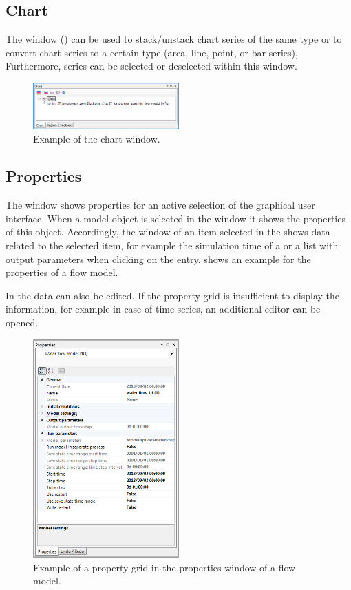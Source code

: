 \subsection{Chart}
\label{subsec:chart}
The  window () can be used to stack/unstack chart series of the same type or to convert chart series to a certain type (area, line, point, or bar series), Furthermore, series can be selected or deselected within this window.
 
\begin{figure} [H]
	\centering
		\includegraphics[width=0.5\textwidth]{Figures/Chapter_overview/view_chart_window.png}
	\caption{Example of the chart window.}
	\label{fig:chartwindow}
\end{figure}
%
\subsection{Properties}
\label{subsec:properties}
%
The  window shows properties for an active selection of the graphical user interface. When a model object is selected in the  window it shows the properties of this object. Accordingly, the  window of an item selected in the  shows data related to the selected item, for example the simulation time of a  or a list with output parameters when clicking on the  entry.  shows an example for the properties of a flow model.

In the  data can also be edited. If the property grid is insufficient to display the information, for example in case of time series, an additional editor can be opened.
%
\begin{figure} [H]
	\centering
		\includegraphics[width=0.5\textwidth]{Figures/Chapter_overview/view_properties_window.png}
	\caption{Example of a property grid in the properties window of a flow model.}
	\label{fig:fig2.6}
\end{figure}
%
